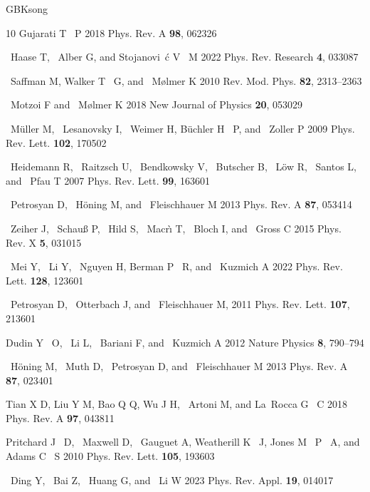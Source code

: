 \documentclass{cpbtex}
\begin{document}
\begin{CJK*}{GBK}{song}
\begin{thebibliography}{10}
Gujarati T ~P 2018 {{Phys. Rev. A}} \textbf{98}, 062326

~Haase T, ~Alber G, and Stojanovi\ifmmode~\else \'{c}\fi{} V ~M 2022
  {{Phys. Rev. Research}} \textbf{4}, 033087 

~Saffman M, Walker T ~G, and ~M\o{}lmer K 2010 {{Rev. Mod. Phys.}} \textbf{82},
  2313--2363

~Motzoi F and ~M{\o}lmer K 2018 {{New Journal of
  Physics}} \textbf{20}, 053029 

~M\"uller M, ~Lesanovsky I, ~Weimer H,  B\"uchler H ~P, and ~Zoller P 2009 {{Phys. Rev. Lett.}} \textbf{102}, 170502

~Heidemann R, ~Raitzsch U, ~Bendkowsky V, ~Butscher B, ~L\"ow R, ~Santos L, and
  ~Pfau T 2007 {{Phys. Rev. Lett.}}
  \textbf{99}, 163601

~Petrosyan D, ~H\"oning M, and ~Fleischhauer M 2013 {{Phys. Rev. A}} \textbf{87}, 053414

~Zeiher J, ~Schau\ss{} P, ~Hild S, ~Macr\`{\i} T, ~Bloch I, and ~Gross C
  2015 {{Phys. Rev. X}} \textbf{5}, 031015 

~Mei Y, ~Li Y, ~Nguyen H, Berman P ~R, and ~Kuzmich A 2022 {{Phys. Rev. Lett.}}
  \textbf{128}, 123601

~Petrosyan D, ~Otterbach J, and ~Fleischhauer M,  2011 {{Phys. Rev.
  Lett.}} \textbf{107}, 213601 

 Dudin Y ~O, ~Li L, ~Bariani F, and ~Kuzmich A 2012 {{Nature
  Physics}} \textbf{8}, 790--794 

~H\"oning M, ~Muth D, ~Petrosyan D, and ~Fleischhauer M 2013
  {{Phys. Rev. A}} \textbf{87}, 023401 

Tian X D, Liu Y M, Bao Q Q, Wu J H, ~Artoni M, and La~Rocca G ~C 2018 {{Phys. Rev. A}} \textbf{97}, 043811

Pritchard J ~D, ~Maxwell D, ~Gauguet A, Weatherill K ~J, Jones M ~P ~A, and
  Adams C ~S 2010 {{Phys. Rev. Lett.}} \textbf{105},
  193603

~Ding Y, ~Bai Z, ~Huang G, and ~Li W 2023 {{Phys. Rev. Appl.}} \textbf{19}, 014017
  

\end{thebibliography}
\end{CJK*}
\end{document}
